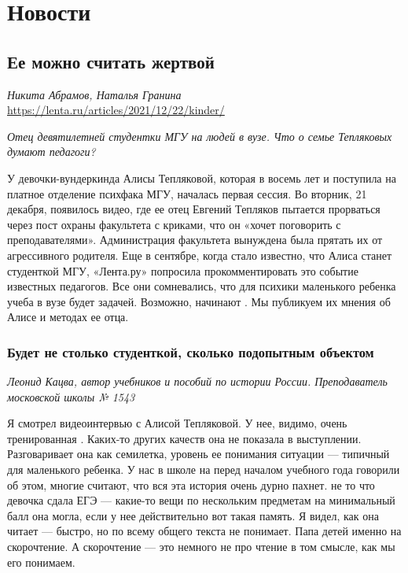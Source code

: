 
\chapter{Новости}

\section{Ее можно считать жертвой}
\textit{Никита Абрамов, Наталья Гранина}\\
\url{https://lenta.ru/articles/2021/12/22/kinder/}

\textit{Отец девятилетней студентки МГУ  на людей в вузе. Что о семье Тепляковых думают педагоги?}

У девочки-вундеркинда Алисы Тепляковой, которая в восемь лет  и поступила на платное отделение психфака МГУ, началась первая сессия. Во вторник, 21 декабря, появилось видео, где ее отец Евгений Тепляков пытается прорваться через пост охраны факультета с криками, что он «хочет поговорить с преподавателями». Администрация факультета вынуждена была прятать их от агрессивного родителя. Еще в сентябре, когда стало известно, что Алиса станет студенткой МГУ, «Лента.ру» попросила прокомментировать это событие известных педагогов. Все они сомневались, что для психики маленького ребенка учеба в вузе будет  задачей. Возможно,  начинают . Мы публикуем их мнения об Алисе и методах ее отца.

\subsection{Будет не столько студенткой, сколько подопытным объектом}
\textit{Леонид Кацва, автор учебников и пособий по истории России. Преподаватель московской школы № 1543}

Я смотрел видеоинтервью с Алисой Тепляковой. У нее, видимо, очень тренированная . Каких-то других качеств она не показала в выступлении. Разговаривает она как семилетка, уровень ее понимания ситуации --- типичный для маленького ребенка. У нас в школе на  перед началом учебного года говорили об этом, многие считают, что вся эта история очень дурно пахнет.  не то что девочка сдала ЕГЭ ---  какие-то вещи по нескольким предметам на минимальный балл она могла, если у нее действительно вот такая память. Я видел, как она читает --- быстро, но  по всему общего  текста не понимает. Папа  детей именно на скорочтение. А скорочтение --- это немного не про чтение в том смысле, как мы его понимаем.

